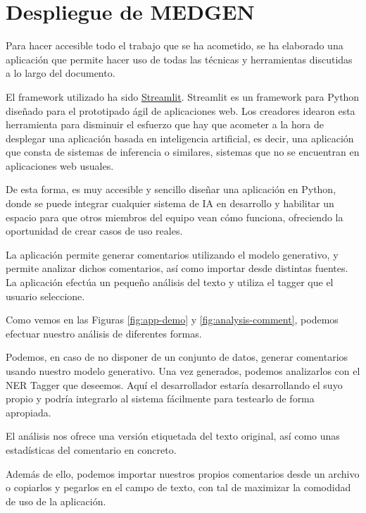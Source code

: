 \section{Despliegue de MEDGEN}

Para hacer accesible todo el trabajo que se ha acometido, se ha elaborado una aplicación que permite hacer uso de todas las técnicas y herramientas discutidas a lo largo del documento. 

El framework utilizado ha sido \href{https://streamlit.io}{Streamlit}. Streamlit es un framework para Python diseñado para el prototipado ágil de aplicaciones web. Los creadores idearon esta herramienta para disminuir el esfuerzo que hay que acometer a la hora de desplegar una aplicación basada en inteligencia artificial, es decir, una aplicación que consta de sistemas de inferencia o similares, sistemas que no se encuentran en aplicaciones web usuales. 

De esta forma, es muy accesible y sencillo diseñar una aplicación en Python, donde se puede integrar cualquier sistema de IA en desarrollo y habilitar un espacio para que otros miembros del equipo vean cómo funciona, ofreciendo la oportunidad de crear casos de uso reales.

La aplicación permite generar comentarios utilizando el modelo generativo, y permite analizar dichos comentarios, así como importar desde distintas fuentes. La aplicación efectúa un pequeño análisis del texto y utiliza el tagger que el usuario seleccione.


Como vemos en las Figuras \ref{fig:app-demo} y \ref{fig:analysis-comment}, podemos efectuar nuestro análisis de diferentes formas.

Podemos, en caso de no disponer de un conjunto de datos, generar comentarios usando nuestro modelo generativo. Una vez generados, podemos analizarlos con el NER Tagger que deseemos. Aquí el desarrollador estaría desarrollando el suyo propio y podría integrarlo al sistema fácilmente para testearlo de forma apropiada. 

El análisis nos ofrece una versión etiquetada del texto original, así como unas estadísticas del comentario en concreto.

Además de ello, podemos importar nuestros propios comentarios desde un archivo o copiarlos y pegarlos en el campo de texto, con tal de maximizar la comodidad de uso de la aplicación.

